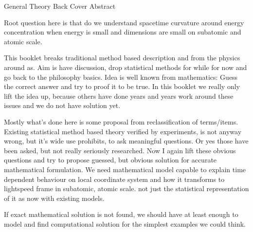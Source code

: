 %
%
%
General Theory Back Cover Abstract\hfill
\label{abstract}


Root question here is that do we understand spacetime curvature around energy
concentration when energy is small and dimensions are small on subatomic and
atomic scale.

This booklet breaks traditional method based description and from the physics
around as. Aim is have discussion, drop statistical methods for while for now
and go back to the philosophy basics. Idea is well known from mathematics:
Guess the correct answer and try to proof it to be true. In this booklet we
really only lift the idea up, because others have done years and years work
around these issues and we do not have solution yet.

Mostly what's done here is some proposal from reclassification of terms/items.
Existing statistical method based theory verified by experiments, is not
anyway wrong, but it's wide use prohibits, to ask meaningful questions. Or yes
those have been asked, but not really seriously researched. Now I again lift
these obvious questions and try to propose guessed, but obvious solution for
accurate mathematical formulation. We need mathematical model capable to
explain time dependent behaviour on local coordinate system and how it
transforms to lightspeed frame in subatomic, atomic scale. not just the
statistical representation of it as now with existing models.

If exact mathematical solution is not found, we should have at least enough to
model and find computational solution for the simplest examples we could think.
 
